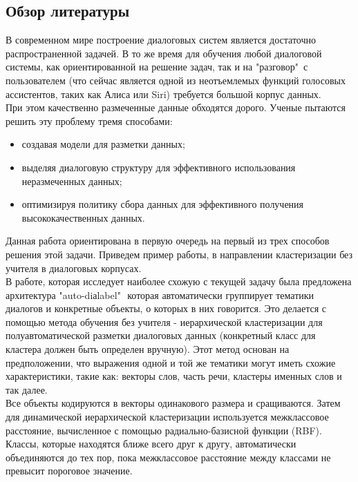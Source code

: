 \documentclass[a4paper,14pt]{article}
\begin{document}
\begin{center}
	\section*{Обзор литературы}
\end{center}
\begin{justify}
В современном мире построение диалоговых систем является достаточно распространенной задачей. В то же время для обучения любой диалоговой системы, как ориентированной на решение задач, так и на "разговор"\ с пользователем (что сейчас является одной из неотъемлемых функций голосовых ассистентов, таких как Алиса или Siri) требуется большой корпус данных.\\
\indent 
При этом качественно размеченные данные обходятся дорого. Ученые пытаются решить эту проблему тремя способами: 
\begin{itemize}
  \item создавая модели для разметки данных; 
  \item выделяя диалоговую структуру для эффективного использования неразмеченных данных; 
  \item оптимизируя политику сбора данных для эффективного получения высококачественных данных. \cite{survey}
\end{itemize}
Данная работа ориентирована в первую очередь на первый из трех способов решения этой задачи. Приведем пример работы, в направлении кластеризации без учителя в диалоговых корпусах. \\
\indent
В работе, которая исследует наиболее схожую с текущей задачу была предложена архитектура "auto-diаlabel"\,\ которая автоматически группирует тематики диалогов и конкретные объекты, о которых в них говорится. Это делается с помощью метода обучения без учителя - иерархической кластеризации для полуавтоматической разметки диалоговых данных (конкретный класс для кластера должен быть определен вручную). Этот метод основан на предположении, что выражения одной и той же тематики могут иметь схожие характеристики, такие как: векторы слов, часть речи, кластеры именных слов и так далее. \\
\indent
Все объекты кодируются в векторы одинакового размера и сращиваются. Затем для динамической иерархической кластеризации используется межклассовое расстояние, вычисленное с помощью радиально-базисной функции (RBF). Классы, которые находятся ближе всего друг к другу, автоматически объединяются до тех пор, пока межклассовое расстояние между классами не превысит пороговое значение. \cite{auto-dial} \\

\end{justify}
\end{document}
